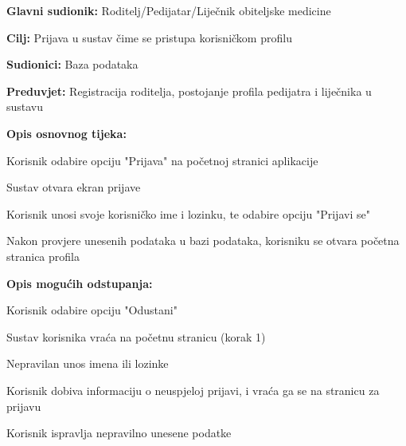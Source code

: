 					\noindent {}
					\begin{packed_item}
						
						\item \textbf{Glavni sudionik: }Roditelj/Pedijatar/Liječnik obiteljske medicine
						\item  \textbf{Cilj:} Prijava u sustav čime se pristupa korisničkom profilu
						\item  \textbf{Sudionici:} Baza podataka
						\item  \textbf{Preduvjet:} Registracija roditelja, postojanje profila pedijatra i liječnika u sustavu
						\item  \textbf{Opis osnovnog tijeka:}
						
						\item[] \begin{packed_enum}
							
							\item Korisnik odabire opciju "Prijava" na početnoj stranici aplikacije
							\item Sustav otvara ekran prijave
							\item Korisnik unosi svoje korisničko ime i lozinku, te odabire opciju "Prijavi se"
							\item Nakon provjere unesenih podataka u bazi podataka, korisniku se otvara početna stranica profila
						\end{packed_enum}
						
						\item  \textbf{Opis mogućih odstupanja:}
						
						\item[] \begin{packed_item}
							\item[3.a] Korisnik odabire opciju "Odustani"
							\item[] \begin{packed_enum}
								\item Sustav korisnika vraća na početnu stranicu (korak 1)
							\end{packed_enum}
							\item[4.a] Nepravilan unos imena ili lozinke
							\item[] \begin{packed_enum}
								
								\item Korisnik dobiva informaciju o neuspjeloj prijavi, i vraća ga se na stranicu za prijavu
								\item Korisnik ispravlja nepravilno unesene podatke
								
							\end{packed_enum}
						\end{packed_item}
					\end{packed_item}
					
